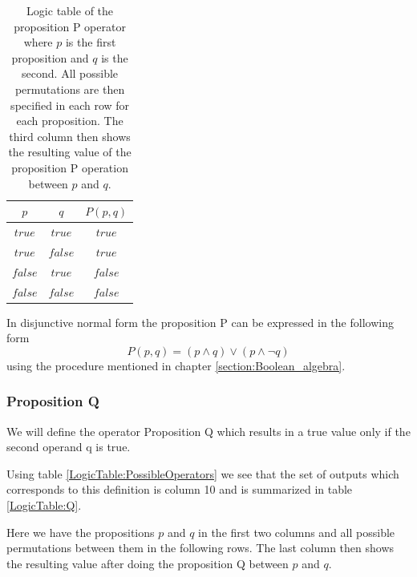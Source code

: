         \begin{table}[h!]
            \centering
            \begin{tabular}{|c|c|c|}
            	\hline
            	  $p$   &   $q$   & $P(p, q)$ \\ \hline
            	$true$  & $true$  &  $true$   \\ \hline
            	$true$  & $false$ &  $true$   \\ \hline
            	$false$ & $true$  &  $false$  \\ \hline
            	$false$ & $false$ &  $false$  \\ \hline
            \end{tabular}
            \caption{Logic table of the proposition P operator where $p$ is the first proposition and $q$ is the second. All possible permutations are then specified in each row for each proposition. The third column then shows the resulting value of the proposition P operation between $p$ and $q$.}
            \label{LogicTable:P}
        \end{table}
        
        In disjunctive normal form the proposition P can be expressed in the following form
        \begin{equation}
            P(p, q) = (p \wedge q) \vee (p \wedge \neg q)
        \end{equation}
        using the procedure mentioned in chapter \ref{section:Boolean_algebra}.
    
    \subsubsection{Proposition Q}
        We will define the operator Proposition Q which results in a true value only if the second operand q is true.
        
        Using table \ref{LogicTable:PossibleOperators} we see that the set of outputs which corresponds to this definition is column 10 and is summarized in table \ref{LogicTable:Q}.
        
        Here we have the propositions $p$ and $q$ in the first two columns and all possible permutations between them in the following rows. The last column then shows the resulting value after doing the proposition Q between $p$ and $q$.
        
